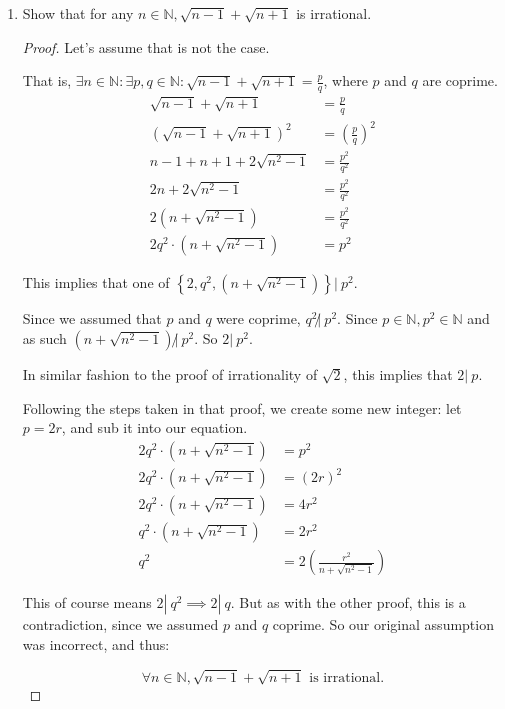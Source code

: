 \documentclass[12pt,letterpaper]{article}
\begin{document}
\begin{enumerate}
    \item Show that for any $n \in \mathbb{N}, \sqrt{n - 1} + \sqrt{n + 1}$ is irrational.

      \begin{proof}
        Let's assume that is not the case.

        That is, $\exists n \in \mathbb{N} : \exists p, q \in \mathbb{N} : \sqrt{n - 1} + \sqrt{n + 1} = \frac{p}{q}$, where $p$ and $q$ are coprime.
        \begin{align*}
          \sqrt{n - 1} + \sqrt{n + 1} &= \frac{p}{q} \\
          \left(\sqrt{n - 1} + \sqrt{n + 1}\right)^2 &= \left(\frac{p}{q}\right)^2 \\
          n - 1 + n + 1 + 2\sqrt{n^2 - 1} &= \frac{p^2}{q^2} \\
          2n + 2\sqrt{n^2 - 1} &= \frac{p^2}{q^2} \\
          2\left(n + \sqrt{n^2 - 1}\right) &= \frac{p^2}{q^2} \\
          2q^2 \cdot \left(n + \sqrt{n^2 - 1}\right) &= p^2
        \end{align*}

        This implies that one of $\left\{2, q^2, \left(n + \sqrt{n^2 - 1}\right)\right\} | \ p^2$.

        Since we assumed that $p$ and $q$ were coprime, $q^2 \not| \ p^2$.
        Since $p \in \mathbb{N}, p^2 \in \mathbb{N}$ and as such
        $\left(n + \sqrt{n^2 - 1}\right) \not| \ p^2$.
        So $2 | \ p^2$.

        In similar fashion to the proof of irrationality of $\sqrt{2}$,
        this implies that $2 | \ p$.

        Following the steps taken in that proof, we create some new integer:
        let $p = 2r$, and sub it into our equation.
        \begin{align*}
          2q^2 \cdot \left(n + \sqrt{n^2 - 1}\right) &= p^2 \\
          2q^2 \cdot \left(n + \sqrt{n^2 - 1}\right) &= (2r)^2 \\
          2q^2 \cdot \left(n + \sqrt{n^2 - 1}\right) &= 4r^2 \\
          q^2 \cdot \left(n + \sqrt{n^2 - 1}\right) &= 2r^2 \\
          q^2 &= 2\left(\frac{r^2}{n + \sqrt{n^2 - 1}}\right)
        \end{align*}

        This of course means $2 | \ q^2 \implies 2 | \ q$.
        But as with the other proof, this is a contradiction, since we assumed $p$ and $q$ coprime.
        So our original assumption was incorrect, and thus:

        \[\forall n \in \mathbb{N}, \sqrt{n - 1} + \sqrt{n + 1} \text{ is irrational.}\]

      \end{proof}

  \end{enumerate}
\end{document}
